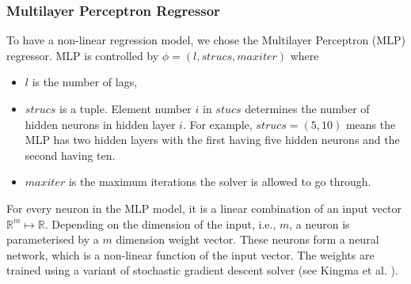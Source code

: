 \subsubsection{Multilayer Perceptron Regressor}
To have a non-linear regression model, we chose the Multilayer Perceptron (MLP) regressor. MLP is controlled by $\phi = (l, strucs, max iter)$ where
\begin{itemize}
    \item $l$ is the number of lags,
    \item $strucs$ is a tuple. Element number $i$ in $stucs$ determines the number of hidden neurons in hidden layer $i$. For example, $strucs = (5, 10)$ means the MLP has two hidden layers with the first having five hidden neurons and the second having ten.
    \item $max iter$ is the maximum iterations the solver is allowed to go through.
\end{itemize}
For every neuron in the MLP model, it is a linear combination of an input vector $\mathbb{R}^m \longmapsto \mathbb{R}$. Depending on the dimension of the input, i.e., $m$, a neuron is parameterised by a $m$ dimension weight vector. These neurons form a neural network, which is a non-linear function of the input vector. The weights are trained using a variant of stochastic gradient descent solver (see Kingma et al. \citeyear{kingma2014adam}).

